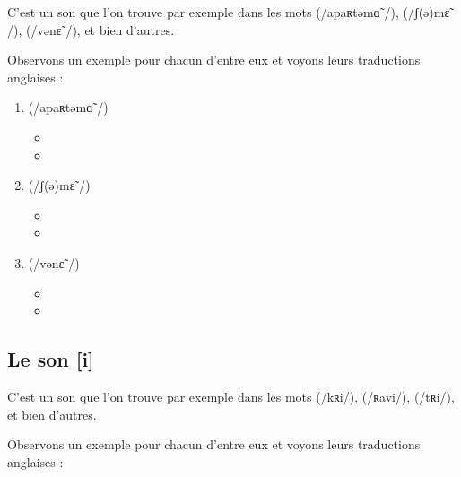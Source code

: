 C'est un son que l'on trouve par exemple dans les mots
 (/apaʀtəmɑ̃ /),  (/ʃ(ə)mɛ̃ /),  (/vənɛ̃ /), et bien d'autres.

Observons un exemple pour chacun d'entre eux et voyons leurs
traductions anglaises :\par

\begin{enumerate}
\item {} (/apaʀtəmɑ̃ /)
  \begin{itemize}
  \item {}
    \item {}
    \end{itemize}
    
\item {} (/ʃ(ə)mɛ̃ /)
  \begin{itemize}
  \item {}
  \item {}
  \end{itemize}

  
\item {} (/vənɛ̃ /)
  \begin{itemize}
  \item {}
  \item {}
  \end{itemize}
   
\end{enumerate}

\subsection{Le son [i]}\label{subsec:ifr}

C'est un son que l'on trouve par exemple dans les mots
 (/kʀi/),  (/ʀavi/),  (/tʀi/), et bien d'autres.

Observons un exemple pour chacun d'entre eux et voyons leurs
traductions anglaises :\par

